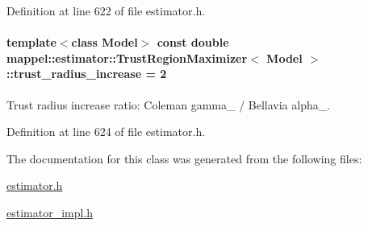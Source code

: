 Definition at line 622 of file estimator.\+h.

\paragraph[{\texorpdfstring{trust\+\_\+radius\+\_\+increase}{trust_radius_increase}}]{\setlength{\rightskip}{0pt plus 5cm}template$<$class Model$>$ const double {\bf mappel\+::estimator\+::\+Trust\+Region\+Maximizer}$<$ Model $>$\+::trust\+\_\+radius\+\_\+increase = 2\hspace{0.3cm}{\ttfamily [static]}}\hypertarget{classmappel_1_1estimator_1_1TrustRegionMaximizer_a8a75c91757ab34a01d0eaed90987e023}{}\label{classmappel_1_1estimator_1_1TrustRegionMaximizer_a8a75c91757ab34a01d0eaed90987e023}


Trust radius increase ratio\+: Coleman gamma\+\_ / Bellavia alpha\+\_. 



Definition at line 624 of file estimator.\+h.



The documentation for this class was generated from the following files\+:\begin{DoxyCompactItemize}
\item 
\hyperlink{estimator_8h}{estimator.\+h}\item 
\hyperlink{estimator__impl_8h}{estimator\+\_\+impl.\+h}\end{DoxyCompactItemize}
